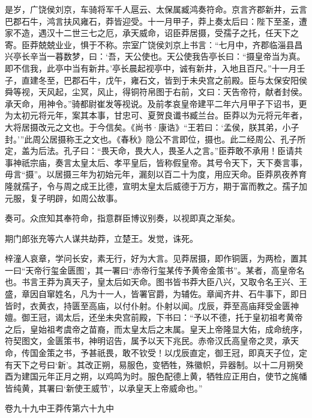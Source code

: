 \documentclass[12pt,UTF8]{ctexbook}
\begin{document}
是岁，广饶侯刘京，车骑将军千人扈云、太保属臧鸿奏符命。京言齐郡新井，云言巴郡石牛，鸿言扶风雍石，莽皆迎受。十一月甲子，莽上奏太后曰：陛下至圣，遭家不造，遇汉十二世三七之厄，承天威命，诏臣莽居摄，受孺子之托，任天下之寄。臣莽兢兢业业，惧于不称。宗室广饶侯刘京上书言：“七月中，齐郡临淄县昌兴亭长辛当一暮数梦，曰：‘吾，天公使也。天公使我告亭长曰：“摄皇帝当为真。即不信我，此亭中当有新井。’亭长晨起视亭中，诚有新井，入地且百尺。”十一月壬子，直建冬至，巴郡石牛，戊午，雍石文，皆到于未央宫之前殿。臣与太保安阳侯舜等视，天风起，尘冥，风止，得铜符帛图于右前，文曰：天告帝符，献者封侯。承天命，用神令。”骑都尉崔发等视说。及前孝哀皇帝建平二年六月甲子下诏书，更为太初元将元年，案其本事，甘忠可、夏贺良谶书臧兰台。臣莽以为元将元年者，大将居摄改元之文也。于今信矣。《尚书·康诰》“王若曰：‘孟侯，朕其弟，小子封。’”此周公居摄称王之文也。《春秋》隐公不言即位，摄也。此二经周公、孔子所定，盖为后法。孔子曰：“畏天命，畏大人，畏圣人之言。”臣莽敢不承用！臣请共事神祇宗庙，奏言太皇太后、孝平皇后，皆称假皇帝。其号令天下，天下奏言事，毋言“摄”。以居摄三年为初始元年，漏刻以百二十为度，用应天命。臣莽夙夜养育隆就孺子，令与周之成王比德，宣明太皇太后威德于万方，期于富而教之。孺子加元服，复子明辟，如周公故事。



奏可。众庶知其奉符命，指意群臣博议别奏，以视即真之渐矣。



期门郎张充等六人谋共劫莽，立楚王。发觉，诛死。



梓潼人哀章，学问长安，素无行，好为大言。见莽居摄，即作铜匮，为两检，置其一曰“天帝行玺金匮图’，其一署曰“赤帝行玺某传予黄帝金策书”。某者，高皇帝名也。书言王莽为真天子，皇太后如天命。图书皆书莽大臣八兴，又取令名王兴、王盛，章因自窜姓名，凡为十一人，皆署官爵，为辅佐。章闻齐井、石牛事下，即日皆时，衣黄衣，持匮至高庙，以付仆射。仆射以闻。戊辰，莽至高庙拜受金匮神嬗。御王冠，谒太后，还坐未央宫前殿，下书曰：“予以不德，托于皇初祖考黄帝之后，皇始祖考虞帝之苗裔，而太皇太后之末属。皇天上帝隆显大佑，成命统序，符契图文，金匮策书，神明诏告，属予以天下兆民。赤帝汉氏高皇帝之灵，承天命，传国金策之书，予甚祇畏，敢不钦受！以戊辰直定，御王冠，即真天子位，定有天下之号曰‘新’。其改正朔，易服色，变牺牲，殊徽帜，异器制。以十二月朔癸酉为建国元年正月之朔，以鸡鸣为时。服色配德上黄，牺牲应正用白，使节之旄幡皆纯黄，其署曰‘新使王威节’，以承皇天上帝威命也。”





卷九十九中王莽传第六十九中
\end{document}
